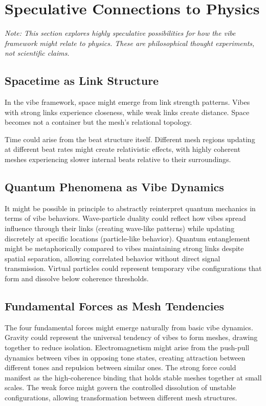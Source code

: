 \section{Speculative Connections to Physics}

\textit{Note: This section explores highly speculative possibilities for how the vibe framework might relate to physics. These are philosophical thought experiments, not scientific claims.}

\subsection{Spacetime as Link Structure}

In the vibe framework, space might emerge from link strength patterns. Vibes with strong links experience closeness, while weak links create distance. Space becomes not a container but the mesh's relational topology.

Time could arise from the beat structure itself. Different mesh regions updating at different beat rates might create relativistic effects, with highly coherent meshes experiencing slower internal beats relative to their surroundings.

\subsection{Quantum Phenomena as Vibe Dynamics}

It might be possible in principle to abstractly reinterpret quantum mechanics in terms of vibe behaviors. Wave-particle duality could reflect how vibes spread influence through their links (creating wave-like patterns) while updating discretely at specific locations (particle-like behavior). Quantum entanglement might be metaphorically compared to vibes maintaining strong links despite spatial separation, allowing correlated behavior without direct signal transmission. Virtual particles could represent temporary vibe configurations that form and dissolve below coherence thresholds.

\subsection{Fundamental Forces as Mesh Tendencies}

The four fundamental forces might emerge naturally from basic vibe dynamics. Gravity could represent the universal tendency of vibes to form meshes, drawing together to reduce isolation. Electromagnetism might arise from the push-pull dynamics between vibes in opposing tone states, creating attraction between different tones and repulsion between similar ones. The strong force could manifest as the high-coherence binding that holds stable meshes together at small scales. The weak force might govern the controlled dissolution of unstable configurations, allowing transformation between different mesh structures.

